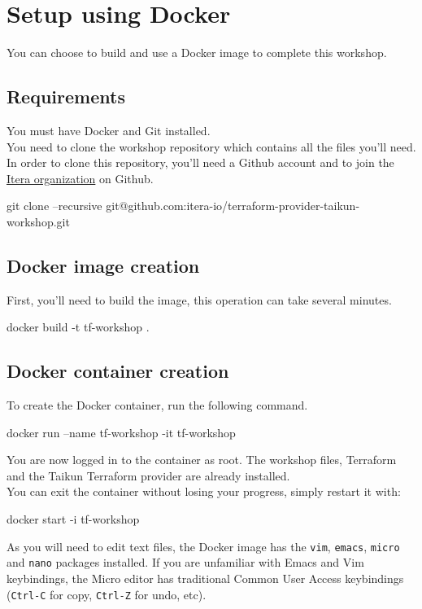 \section{Setup using Docker}\label{sec:docker}

You can choose to build and use a Docker image to complete this workshop.

\subsection{Requirements}

You must have Docker and Git installed.\\
You need to clone the workshop repository which contains all the files you'll need.\\
In order to clone this repository, you'll need a Github account and to join the \href{https://github.com/itera-io}{Itera organization} on Github.

\begin{shell}
git clone --recursive git@github.com:itera-io/terraform-provider-taikun-workshop.git
\end{shell}

\subsection{Docker image creation}

First, you'll need to build the image, this operation can take several minutes.

\begin{shell}
docker build -t tf-workshop .
\end{shell}

\subsection{Docker container creation}
To create the Docker container, run the following command.
\begin{shell}
docker run --name tf-workshop -it tf-workshop
\end{shell}
You are now logged in to the container as root. The workshop files,
Terraform and the Taikun Terraform provider are already installed.\\

You can exit the container without losing your progress, simply restart it with:
\begin{shell}
docker start -i tf-workshop
\end{shell}

As you will need to edit text files, the Docker image has the \texttt{vim},
\texttt{emacs}, \texttt{micro} and \texttt{nano} packages installed.
If you are unfamiliar with Emacs and Vim keybindings, the Micro editor
has traditional Common User Access keybindings (\texttt{Ctrl-C} for copy,
\texttt{Ctrl-Z} for undo, etc).

